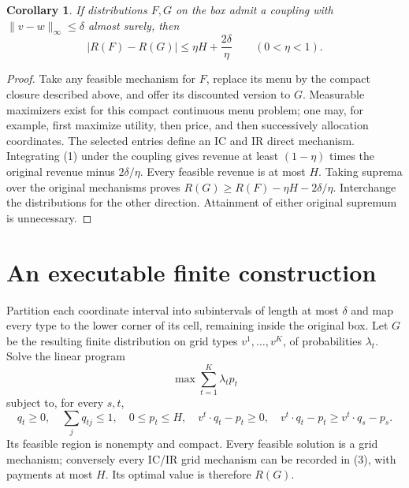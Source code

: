 \documentclass[11pt]{article}
\newtheorem{corollary}[theorem]{Corollary}
\theoremstyle{definition}
\begin{document}
\begin{corollary}
If distributions $F,G$ on the box admit a coupling with
$\|v-w\|_\infty\le\delta$ almost surely, then
\[
 |R(F)-R(G)|\le \eta H+\frac{2\delta}{\eta}
                    \qquad(0<\eta<1).                  \tag{2}
\]
\end{corollary}
\begin{proof}
Take any feasible mechanism for $F$, replace its menu by the compact
closure described above, and offer its discounted version to $G$.
Measurable maximizers exist for this compact continuous menu problem;
one may, for example, first maximize utility, then price, and then
successively allocation coordinates. The selected entries define an IC
and IR direct mechanism. Integrating (1) under the coupling gives revenue
at least $(1-\eta)$ times the original revenue minus $2\delta/\eta$.
Every feasible revenue is at most $H$. Taking suprema over the original
mechanisms proves $R(G)\ge R(F)-\eta H-2\delta/\eta$.
Interchange the distributions for the other direction. Attainment of
either original supremum is unnecessary.
\end{proof}

\section*{An executable finite construction}
Partition each coordinate interval into subintervals of length at most
$\delta$ and map every type to the lower corner of its cell, remaining
inside the original box. Let $G$ be the resulting finite distribution
on grid types $v^1,\ldots,v^K$, of probabilities $\lambda_t$.
Solve the linear program
\[
 \max\sum_{t=1}^K\lambda_t p_t
\]
subject to, for every $s,t$,
\[
 q_t\ge0,\quad\sum_jq_{tj}\le1,\quad0\le p_t\le H,
 \quad v^t\cdot q_t-p_t\ge0,
 \quad v^t\cdot q_t-p_t\ge v^t\cdot q_s-p_s.             \tag{3}
\]
Its feasible region is nonempty and compact. Every feasible solution is
a grid mechanism; conversely every IC/IR grid mechanism can be recorded
in (3), with payments at most $H$. Its optimal value is therefore $R(G)$.
\end{document}
